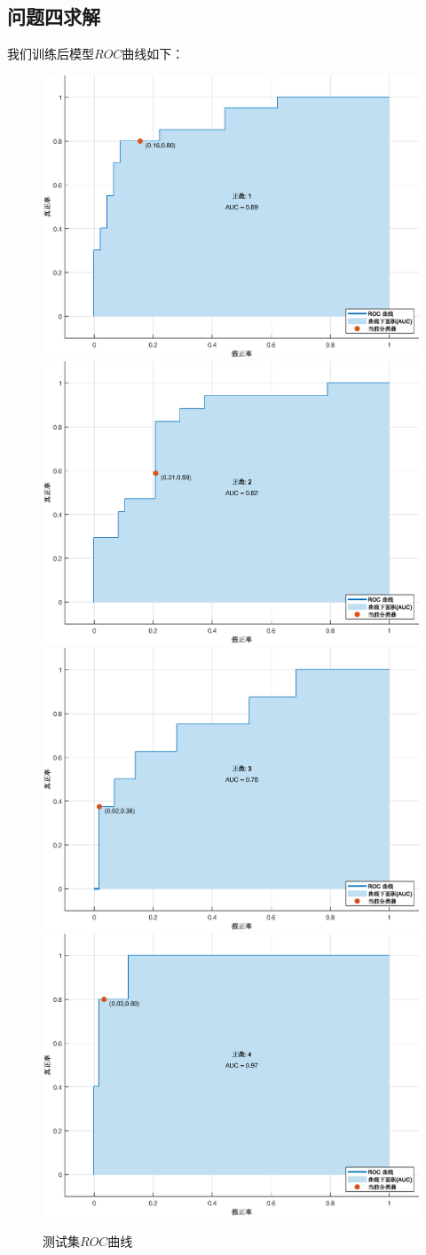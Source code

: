 \documentclass{cumcmthesis}
\begin{document}
\subsection{问题四求解}
我们训练后模型$ROC$曲线如下：
\begin{figure}[H]
\centering
\includegraphics[width=.49\textwidth]{figures/31.eps}
\includegraphics[width=.49\textwidth]{figures/32.eps}
\includegraphics[width=.49\textwidth]{figures/33.eps}
\includegraphics[width=.49\textwidth]{figures/34.eps}
\caption{测试集$ROC$曲线}
\end{figure}
\end{document}
